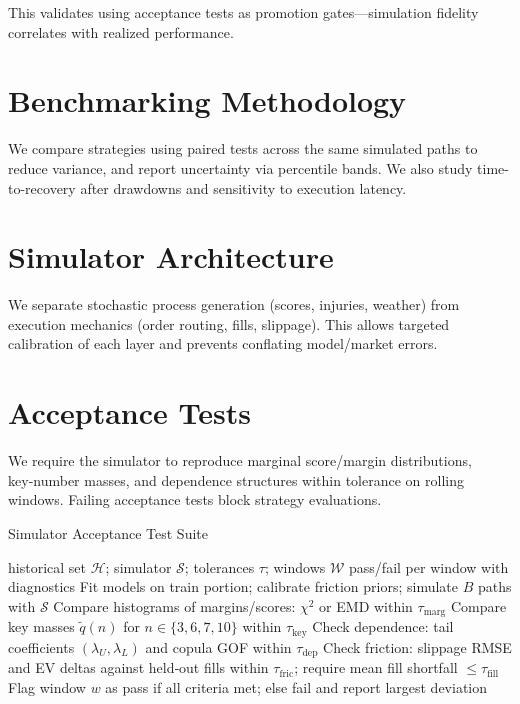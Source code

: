 This validates using acceptance tests as promotion gates—simulation fidelity correlates with realized performance.

\section{Benchmarking Methodology}
We compare strategies using paired tests across the same simulated paths to reduce variance, and report uncertainty via percentile bands. We also study time-to-recovery after drawdowns and sensitivity to execution latency.

\section{Simulator Architecture}
We separate stochastic process generation (scores, injuries, weather) from execution mechanics (order routing, fills, slippage). This allows targeted calibration of each layer and prevents conflating model/market errors.

\section{Acceptance Tests}
We require the simulator to reproduce marginal score/margin distributions, key‑number masses, and dependence structures within tolerance on rolling windows. Failing acceptance tests block strategy evaluations.

\begin{algorithm}[t]
  \caption{Simulator Acceptance Test Suite}
  \label{alg:sim-accept}
  \begin{algorithmic}[1]
    \Require historical set $\mathcal H$; simulator $\mathcal S$; tolerances $\tau$; windows $\mathcal W$
    \Ensure pass/fail per window with diagnostics
      \State Fit models on train portion; calibrate friction priors; simulate $B$ paths with $\mathcal S$
      \State Compare histograms of margins/scores: $\chi^2$ or EMD within $\tau_{\text{marg}}$
      \State Compare key masses $\tilde q(n)$ for $n\in\{3,6,7,10\}$ within $\tau_{\text{key}}$
      \State Check dependence: tail coefficients $(\lambda_U,\lambda_L)$ and copula GOF within $\tau_{\text{dep}}$
      \State Check friction: slippage RMSE and EV deltas against held‑out fills within $\tau_{\text{fric}}$; require mean fill shortfall $\le \tau_{\text{fill}}$
      \State Flag window $w$ as pass if all criteria met; else fail and report largest deviation
    \EndFor
  \end{algorithmic}
\end{algorithm}

